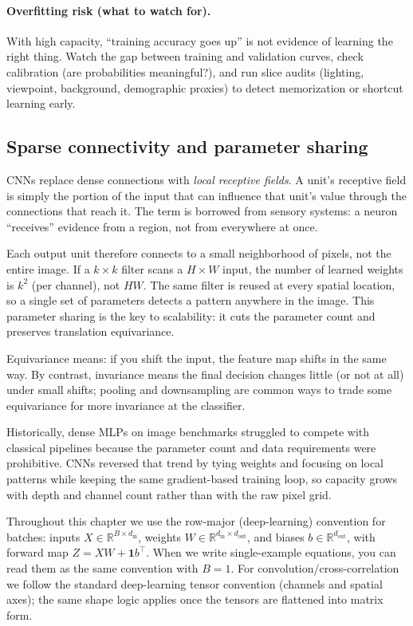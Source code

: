 \paragraph{Overfitting risk (what to watch for).}
With high capacity, ``training accuracy goes up'' is not evidence of learning the right thing. Watch the gap between training and validation curves, check calibration (are probabilities meaningful?), and run slice audits (lighting, viewpoint, background, demographic proxies) to detect memorization or shortcut learning early.

\subsection{Sparse connectivity and parameter sharing}
\label{sec:cnn_sparse_connectivity_and_parameter_sharing}

CNNs replace dense connections with \emph{local receptive fields}. A unit's receptive field is simply the portion of the input that can influence that unit's value through the connections that reach it. The term is borrowed from sensory systems: a neuron ``receives'' evidence from a region, not from everywhere at once.

Each output unit therefore connects to a small neighborhood of pixels, not the entire image. If a \(k \times k\) filter scans a \(H\times W\) input, the number of learned weights is \(k^2\) (per channel), not \(HW\). The same filter is reused at every spatial location, so a single set of parameters detects a pattern anywhere in the image. This parameter sharing is the key to scalability: it cuts the parameter count and preserves translation equivariance.

Equivariance means: if you shift the input, the feature map shifts in the same way. By contrast, invariance means the final decision changes little (or not at all) under small shifts; pooling and downsampling are common ways to trade some equivariance for more invariance at the classifier.

Historically, dense MLPs on image benchmarks struggled to compete with classical pipelines because the parameter count and data requirements were prohibitive. CNNs reversed that trend by tying weights and focusing on local patterns while keeping the same gradient-based training loop, so capacity grows with depth and channel count rather than with the raw pixel grid.

\begin{tcolorbox}[summarybox, title={Shape reminder}]
Throughout this chapter we use the row-major (deep-learning) convention for batches: inputs \(X\in\mathbb{R}^{B\times d_{\text{in}}}\), weights \(W\in\mathbb{R}^{d_{\text{in}}\times d_{\text{out}}}\), and biases \(b\in\mathbb{R}^{d_{\text{out}}}\), with forward map \(Z=XW+\mathbf{1}b^\top\). When we write single-example equations, you can read them as the same convention with \(B=1\). For convolution/cross-correlation we follow the standard deep-learning tensor convention (channels and spatial axes); the same shape logic applies once the tensors are flattened into matrix form.
\end{tcolorbox}

